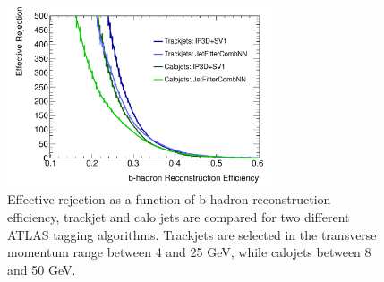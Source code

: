 \begin{figure}[tp]
\centering
\includegraphics[width=0.7\textwidth]{figure/trackjet/eff_real_rej_mod.pdf}
\caption{Effective rejection as a function of b-hadron reconstruction efficiency, trackjet and calo jets are
	compared for two different ATLAS tagging algorithms. Trackjets are selected in the transverse momentum range 
	between 4 and 25 GeV, while calojets between 8 and 50 GeV.}
\label{fig:cj_tj}
\end{figure}    

